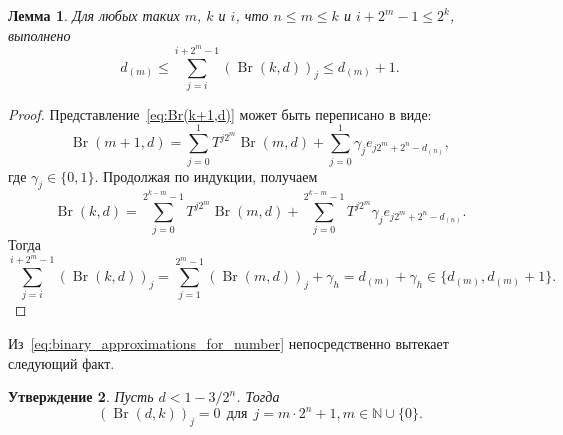 \documentclass[a4paper,14pt]{article} %
\theoremstyle{plain}
\newtheorem{lemma}{Лемма}[section]
\newtheorem{proposition}[lemma]{Утверждение}
\begin{document}
\begin{lemma}
	\label{lem:sum_Br_k_c}
	Для любых таких $m$, $k$ и $i$, что $n \leq m \leq k$ и  $ i + 2^m - 1 \leq 2^k$,
	выполнено
	\begin{equation}
		d_{(m)} \leq \sum_{j=i}^{i+2^m-1} (\operatorname{Br}(k,d))_j \leq d_{(m)}+1
		.
	\end{equation}
\end{lemma}
\begin{proof}
	Представление~\eqref{eq:Br(k+1,d)} может быть переписано в виде:
	\begin{equation}
		\operatorname{Br}(m+1,d) = \sum_{j=0}^{1} T^{j2^m} \operatorname{Br}(m,d) + \sum_{j=0}^{1} \gamma_{j} e_{j 2^m+2^n-d_{(n)}}
		,
	\end{equation}
	где $\gamma_{j} \in \{0,1\}$.
	Продолжая по индукции, получаем
	\begin{equation}
		\operatorname{Br}(k,d) = \sum_{j=0}^{2^{k-m}-1} T^{j2^m} \operatorname{Br}(m,d) +
		\sum_{j=0}^{2^{k-m}-1} T^{j2^m} \gamma_{j} e_{j2^m+2^n-d_{(n)}}
		.
	\end{equation}
	Тогда
	\begin{equation}
		\sum_{j=i}^{i+2^m-1} (\operatorname{Br}(k,d))_j
		=
		\sum_{j=1}^{2^m-1} (\operatorname{Br}(m,d))_j
		+ \gamma_h
		=
		d_{(m)} + \gamma_h
		\in \{d_{(m)}, d_{(m)}+1\}
		.
	\end{equation}
\end{proof}

Из~\eqref{eq:binary_approximations_for_number} непосредственно вытекает следующий факт.
\begin{proposition}
	\label{prop:Br_has_nulls}
	Пусть $d<1-3/2^n$.
	Тогда
	\begin{equation}
		(\operatorname{Br}(d,k))_j = 0 ~~\mbox{для}~~j = m\cdot 2^n + 1, m\in\mathbb{N} \cup\{0\}
		.
	\end{equation}
\end{proposition}
\end{document}
